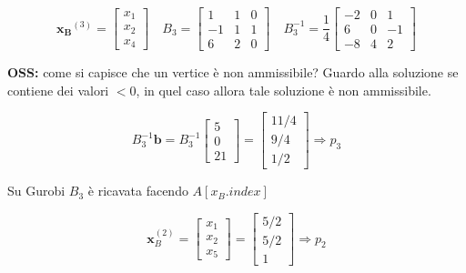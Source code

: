 \documentclass[a4paper, 11pt]{article}
\begin{document}
                \[
                    \mathbf{x_B}^{(3)} =
                    \begin{bmatrix}
                        x_1 \\ x_2 \\x_4
                    \end{bmatrix}
                    \quad
                    B_3 =
                    \begin{bmatrix}
                        1 & 1 & 0 \\
                        -1 & 1 & 1 \\
                        6 & 2 & 0
                    \end{bmatrix}
                    \quad
                    B_3^{-1} =
                    \frac{1}{4}
                    \begin{bmatrix}
                        -2 & 0 & 1 \\
                        6 & 0 & -1 \\
                        -8 & 4 & 2
                    \end{bmatrix}
                \]
                    
                    

                \textbf{OSS: } come si capisce che un vertice è non ammissibile? Guardo alla soluzione se contiene dei valori $< 0$, in quel caso allora tale soluzione è non ammissibile.
                
                
                
                \[
                    B_3^{-1} \mathbf{b} =
                    B_3^{-1}
                    \begin{bmatrix}
                        5 \\ 0 \\ 21
                    \end{bmatrix}
                    =
                    \begin{bmatrix}
                        11/4 \\
                        9/4 \\
                        1/2
                    \end{bmatrix}
                    \Rightarrow p_3
                \]


                Su Gurobi $B_3$ è ricavata facendo $A[x_B.index]$


                

                \[
                    \mathbf{x}_B^{(2)} = \begin{bmatrix} x_1 \\ x_2 \\ x_5 \end{bmatrix} = \begin{bmatrix} 5/2 \\ 5/2 \\ 1 \end{bmatrix} \Rightarrow p_2
                \]
    
\end{document}
